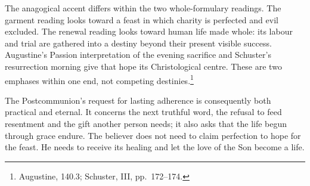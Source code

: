 The anagogical accent differs within the two whole-formulary
readings. The garment reading looks toward a feast in which
charity is perfected and evil excluded. The renewal reading
looks toward human life made whole: its labour and trial are
gathered into a destiny beyond their present visible success.
Augustine's Passion interpretation of the evening sacrifice and
Schuster's resurrection morning give that hope its Christological
centre. These are two emphases within one end, not competing
destinies.\footnote{Augustine,  140.3;
Schuster,  III, pp.~172--174.}

The Postcommunion's request for lasting adherence is consequently
both practical and eternal. It concerns the next truthful word,
the refusal to feed resentment and the gift another person needs;
it also asks that the life begun through grace endure. The
believer does not need to claim perfection to hope for the feast.
He needs to receive its healing and let the love of the Son
become a life.
